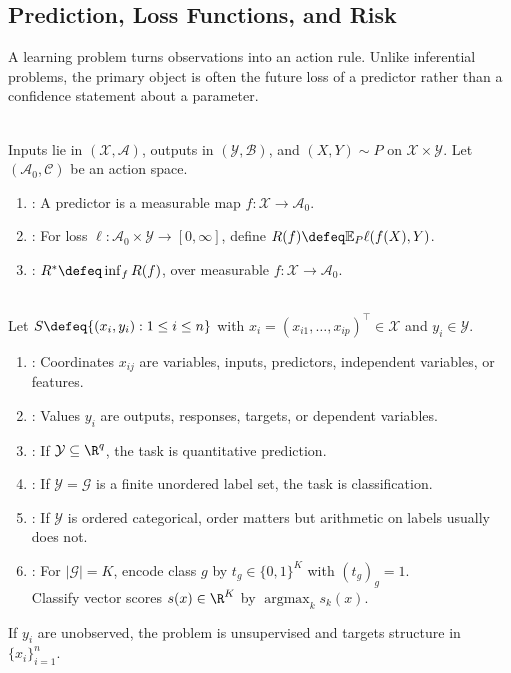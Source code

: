 \subsection{Prediction, Loss Functions, and Risk}

A learning problem turns observations into an action rule.  Unlike inferential problems, the primary object is often the future loss of a predictor rather than a confidence statement about a parameter.

\begin{definition} \label{def:sl-prediction-problem-risk} \\
 Inputs lie in $(\mathcal{X},\mathcal{A})$, outputs in $(\mathcal{Y},\mathcal{B})$, and $(X,Y)\sim P$ on $\mathcal{X}\times\mathcal{Y}$. Let $(\mathcal{A}_0,\mathcal{C})$ be an action space.
\begin{enumerate}[label=(\roman*)]
\setlength{\itemsep}{0pt}
\item {}: A predictor is a measurable map $f:\mathcal{X}\to\mathcal{A}_0$.
\item {}: For loss $\ell:\mathcal{A}_0\times\mathcal{Y}\to[0,\infty]$, define $R(f)\defeq\mathbb{E}_{P}\ell(f(X),Y)$.
\item {}: $R^*\defeq\inf_fR(f)$, over measurable $f:\mathcal{X}\to\mathcal{A}_0$.
\end{enumerate}
\end{definition}

\begin{definition} \label{def:sl-supervised-learning-terminology} \\
Let $S\defeq\{(x_i,y_i):1\leq i\leq n\}$ with $x_i=(x_{i1},\ldots,x_{ip})^\top\in\mathcal{X}$ and $y_i\in\mathcal{Y}$.
\begin{enumerate}[label=(\roman*)]
\setlength{\itemsep}{0pt}
\item {}: Coordinates $x_{ij}$ are variables, inputs, predictors, independent variables, or features.
\item {}: Values $y_i$ are outputs, responses, targets, or dependent variables.
\item {}: If $\mathcal{Y}\subseteq\R^q$, the task is quantitative prediction.
\item {}: If $\mathcal{Y}=\mathcal{G}$ is a finite unordered label set, the task is classification.
\item {}: If $\mathcal{Y}$ is ordered categorical, order matters but arithmetic on labels usually does not.
\item {}: For $|\mathcal{G}|=K$, encode class $g$ by $t_g\in\{0,1\}^K$ with $(t_g)_g=1$.\\
Classify vector scores $s(x)\in\R^K$ by $\operatorname*{argmax}_k s_k(x)$.
\end{enumerate}
If $y_i$ are unobserved, the problem is unsupervised and targets structure in $\{x_i\}_{i=1}^n$.
\end{definition}

